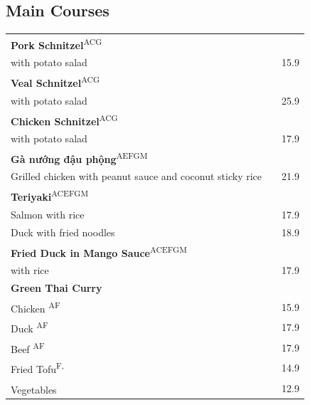 \documentclass[a4paper,12pt]{article}
\newcommand{\vegan}{\textbf{\scriptsize \color{vegan}{Vegan}}}
\begin{document}
\begin{multicols}{2}
\section*{Main Courses}
\begin{tabular}{Lrr}
\textbf{Pork Schnitzel}\textsuperscript{{\scriptsize ACG}}\\
\hspace{0.4cm}\scriptsize with potato salad & & 15.9\\
\textbf{Veal Schnitzel}\textsuperscript{{\scriptsize ACG}}\\
\hspace{0.4cm}\scriptsize with potato salad & & 25.9\\
\textbf{Chicken Schnitzel}\textsuperscript{{\scriptsize ACG}}\\
\hspace{0.4cm}\scriptsize with potato salad & & 17.9\\
\textbf{Gà nướng đậu phộng}\textsuperscript{{\scriptsize AEFGM}}\\
\hspace{0.4cm}\scriptsize Grilled chicken with peanut sauce and coconut sticky rice & & 21.9\\
\textbf{Teriyaki}\textsuperscript{{\scriptsize ACEFGM}}\\
\hspace{0.4cm}Salmon with rice & & 17.9\\
\hspace{0.4cm}Duck with fried noodles & & 18.9\\
\textbf{Fried Duck in Mango Sauce}\textsuperscript{{\scriptsize ACEFGM}}\\
\hspace{0.4cm}\scriptsize with rice & & 17.9\\
\textbf{Green Thai Curry}\\
\hspace{0.4cm}Chicken \textsuperscript{{\scriptsize AF}} & & 15.9\\
\hspace{0.4cm}Duck \textsuperscript{{\scriptsize AF}} & & 17.9\\
\hspace{0.4cm}Beef \textsuperscript{{\scriptsize AF}} & & 17.9\\
\hspace{0.4cm}Fried Tofu\textsuperscript{{\scriptsize F, \vegan}} & & 14.9\\
\hspace{0.4cm}Vegetables\textsuperscript{\vegan} & & 12.9\\

\end{tabular}
\end{multicols}
\end{document}
